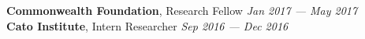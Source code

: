 \documentclass[a4paper,11pt]{article}
\begin{document}
\textbf{Commonwealth Foundation}, Research Fellow \hfill \textit{Jan 2017 --- May 2017}\\

\textbf{Cato Institute}, Intern Researcher \hfill \textit{Sep 2016 --- Dec 2016}\\
\vspace{0.5mm}
\end{document}
